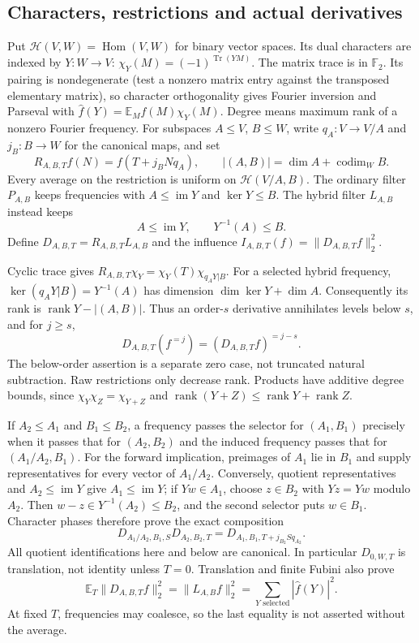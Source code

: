 \subsection{Characters, restrictions and actual derivatives}
Put $\mathcal H(V,W)=\operatorname{Hom}(V,W)$ for binary vector spaces.
Its dual characters are indexed by $Y:W\to V$:
$\chi_Y(M)=(-1)^{\operatorname{Tr}(YM)}$. The matrix trace is in
$\mathbb F_2$. Its pairing is nondegenerate (test a nonzero matrix entry
against the transposed elementary matrix), so character orthogonality
gives Fourier inversion and Parseval with
$\widehat f(Y)=\mathbb E_M f(M)\chi_Y(M)$.
Degree means maximum rank of a nonzero Fourier frequency. For subspaces
$A\le V$, $B\le W$, write $q_A:V\to V/A$ and $j_B:B\to W$ for the
canonical maps, and set
\[
 R_{A,B,T}f(N)=f(T+j_BNq_A),\qquad
 |(A,B)|=\dim A+\operatorname{codim}_W B.
\]
Every average on the restriction is uniform on $\mathcal H(V/A,B)$.
The ordinary filter $P_{A,B}$ keeps frequencies with
$A\le\operatorname{im}Y$ and $\ker Y\le B$. The hybrid filter
$L_{A,B}$ instead keeps
\[
 A\le\operatorname{im}Y,\qquad Y^{-1}(A)\le B.
\]
Define $D_{A,B,T}=R_{A,B,T}L_{A,B}$ and the influence
$I_{A,B,T}(f)=\|D_{A,B,T}f\|_2^2$.

Cyclic trace gives
$R_{A,B,T}\chi_Y=\chi_Y(T)\chi_{q_AY|B}$.
For a selected hybrid frequency,
$\ker(q_AY|B)=Y^{-1}(A)$ has dimension $\dim\ker Y+\dim A$.
Consequently its rank is $\operatorname{rank}Y-|(A,B)|$.
Thus an order-$s$ derivative annihilates levels below $s$, and for
$j\ge s$,
\[
 D_{A,B,T}(f^{=j})=(D_{A,B,T}f)^{=j-s}.
\]
The below-order assertion is a separate zero case, not truncated
natural subtraction. Raw restrictions only decrease rank. Products have
additive degree bounds, since $\chi_Y\chi_Z=\chi_{Y+Z}$ and
$\operatorname{rank}(Y+Z)\le\operatorname{rank}Y+\operatorname{rank}Z$.

If $A_2\le A_1$ and $B_1\le B_2$, a frequency passes the selector for
$(A_1,B_1)$ precisely when it passes that for $(A_2,B_2)$ and the induced
frequency passes that for $(A_1/A_2,B_1)$. For the forward implication,
preimages of $A_1$ lie in $B_1$ and supply representatives for every
vector of $A_1/A_2$. Conversely, quotient representatives and
$A_2\le\operatorname{im}Y$ give $A_1\le\operatorname{im}Y$; if
$Yw\in A_1$, choose $z\in B_2$ with $Yz=Yw$ modulo $A_2$.
Then $w-z\in Y^{-1}(A_2)\le B_2$, and the second selector puts $w\in B_1$.
Character phases therefore prove the exact composition
\[
 D_{A_1/A_2,B_1,S}D_{A_2,B_2,T}
   =D_{A_1,B_1,T+j_{B_2}Sq_{A_2}}.                 \tag{A1}
\]
All quotient identifications here and below are canonical. In particular
$D_{0,W,T}$ is translation, not identity unless $T=0$.
Translation and finite Fubini also prove
\[
 \mathbb E_T\|D_{A,B,T}f\|_2^2
   =\|L_{A,B}f\|_2^2
   =\sum_{Y\text{ selected}}|\widehat f(Y)|^2.       \tag{A2}
\]
At fixed $T$, frequencies may coalesce, so the last equality is not
asserted without the average.


